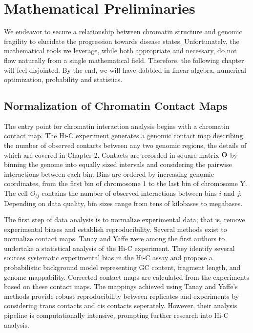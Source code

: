 
\chapter{Mathematical Preliminaries}

We endeavor to secure a relationship between chromatin structure and genomic fragility to elucidate the progression towards
disease states.  Unfortunately, the mathematical tools we leverage, while both appropriate and necessary, do not flow
naturally from a single mathematical field.  Therefore, the following chapter will feel disjointed.  By the end, we will have
dabbled in linear algebra, numerical optimization, probability and statistics.

\section*{Normalization of Chromatin Contact Maps}

The entry point for chromatin interaction analysis begins with a chromatin \gls{contact map}.  The Hi-C experiment generates a
genomic contact map describing the number of observed contacts between any two genomic regions, the details of which are covered
in Chapter 2.  Contacts are recorded in square matrix $\mathbf{O}$ by binning the genome into equally sized intervals and considering
the pairwise interactions between each bin.  Bins are ordered by increasing genomic coordinates, from the first bin of chromosome 1 to
the last bin of chromosome Y.  The cell $O_{ij}$ contains the number of observed interactions between bins $i$ and $j$.  Depending on
data quality, bin sizes range from tens of kilobases to megabases.

The first step of data analysis is to \gls{normalize} experimental data; that is, remove experimental biases and establish reproducibility.
Several methods exist to normalize contact maps.  Tanay and Yaffe were among the first authors to undertake a statistical analysis of the Hi-C experiment\cite{yaffe2011}.
They identify several sources systematic experimental bias in the Hi-C assay and propose a probabilistic background model representing \gls{GC}
content, fragment length, and genome mappability.  Corrected contact maps are calculated from the experiments based on these contact maps.  The mappings achieved using Tanay
and Yaffe's methods provide robust reproducibility between replicates and experiments by considering \gls{trans contacts} and \gls{cis contacts}
seperately\cite{yaffe2011}.  However, their analysis pipeline is computationally intensive, prompting further research into Hi-C analysis.

